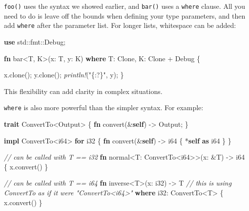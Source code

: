 \documentclass[a4paper,]{book}
\newenvironment{Shaded}{\begin{snugshade}}{\end{snugshade}}
\newcommand{\KeywordTok}[1]{\textcolor[rgb]{0.13,0.29,0.53}{\textbf{{#1}}}}
\newcommand{\DataTypeTok}[1]{\textcolor[rgb]{0.13,0.29,0.53}{{#1}}}
\newcommand{\StringTok}[1]{\textcolor[rgb]{0.31,0.60,0.02}{{#1}}}
\newcommand{\CommentTok}[1]{\textcolor[rgb]{0.56,0.35,0.01}{\textit{{#1}}}}
\newcommand{\BuiltInTok}[1]{{#1}}
\newcommand{\PreprocessorTok}[1]{\textcolor[rgb]{0.56,0.35,0.01}{\textit{{#1}}}}
\newcommand{\NormalTok}[1]{{#1}}
\begin{document}
\texttt{foo()} uses the syntax we showed earlier, and \texttt{bar()}
uses a \texttt{where} clause. All you need to do is leave off the bounds
when defining your type parameters, and then add \texttt{where} after
the parameter list. For longer lists, whitespace can be added:

\begin{Shaded}
\begin{Highlighting}[]
\KeywordTok{use} \NormalTok{std::fmt::}\BuiltInTok{Debug}\NormalTok{;}

\KeywordTok{fn} \NormalTok{bar<T, K>(x: T, y: K)}
    \KeywordTok{where} \NormalTok{T: }\BuiltInTok{Clone}\NormalTok{,}
          \NormalTok{K: }\BuiltInTok{Clone} \NormalTok{+ }\BuiltInTok{Debug} \NormalTok{\{}

    \NormalTok{x.clone();}
    \NormalTok{y.clone();}
    \PreprocessorTok{println!}\NormalTok{(}\StringTok{"\{:?\}"}\NormalTok{, y);}
\NormalTok{\}}
\end{Highlighting}
\end{Shaded}

This flexibility can add clarity in complex situations.

\texttt{where} is also more powerful than the simpler syntax. For
example:

\begin{Shaded}
\begin{Highlighting}[]
\KeywordTok{trait} \NormalTok{ConvertTo<Output> \{}
    \KeywordTok{fn} \NormalTok{convert(&}\KeywordTok{self}\NormalTok{) -> Output;}
\NormalTok{\}}

\KeywordTok{impl} \NormalTok{ConvertTo<}\DataTypeTok{i64}\NormalTok{> }\KeywordTok{for} \DataTypeTok{i32} \NormalTok{\{}
    \KeywordTok{fn} \NormalTok{convert(&}\KeywordTok{self}\NormalTok{) -> }\DataTypeTok{i64} \NormalTok{\{ *}\KeywordTok{self} \KeywordTok{as} \DataTypeTok{i64} \NormalTok{\}}
\NormalTok{\}}

\CommentTok{// can be called with T == i32}
\KeywordTok{fn} \NormalTok{normal<T: ConvertTo<}\DataTypeTok{i64}\NormalTok{>>(x: &T) -> }\DataTypeTok{i64} \NormalTok{\{}
    \NormalTok{x.convert()}
\NormalTok{\}}

\CommentTok{// can be called with T == i64}
\KeywordTok{fn} \NormalTok{inverse<T>(x: }\DataTypeTok{i32}\NormalTok{) -> T}
        \CommentTok{// this is using ConvertTo as if it were "ConvertTo<i64>"}
        \KeywordTok{where} \DataTypeTok{i32}\NormalTok{: ConvertTo<T> \{}
    \NormalTok{x.convert()}
\NormalTok{\}}
\end{Highlighting}
\end{Shaded}
\end{document}
